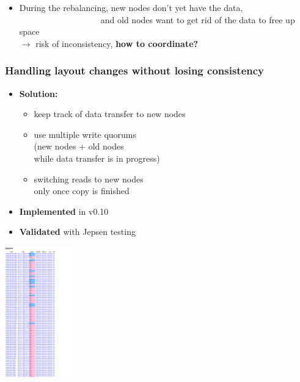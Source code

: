 \documentclass[aspectratio=169,xcolor={svgnames}]{beamer}
\begin{document}
\begin{frame}
\begin{itemize}
			\vspace{2em}
		\item<3-> During the rebalancing, new nodes don't yet have the data,\\
			~~~~~~~~~~~~~~~~~~~and old nodes want to get rid of the data to free up space\\
			\vspace{1.2em}
			$\to$ risk of inconsistency, \textbf{how to coordinate?}
	\end{itemize}
\end{frame}

\begin{frame}
	\frametitle{Handling layout changes without losing consistency}
	\begin{minipage}{.55\textwidth}
		\begin{itemize}
			\item \textbf{Solution:}\\
				\vspace{.5em}
				\begin{itemize}
					\item keep track of data transfer to new nodes
						\vspace{.5em}
					\item use multiple write quorums\\
						(new nodes + old nodes\\
						while data transfer is in progress)
						\vspace{.5em}
					\item switching reads to new nodes\\
						only once copy is finished
				\end{itemize}
				\vspace{1em}
			\item \textbf{Implemented} in v0.10
				\vspace{1em}
			\item \textbf{Validated} with Jepsen testing
		\end{itemize}
	\end{minipage}
	\begin{minipage}{.23\textwidth}
		\includegraphics[width=3cm]{../assets/jepsen-0.9.png}\\

\end{minipage}
\end{frame}
\end{document}
